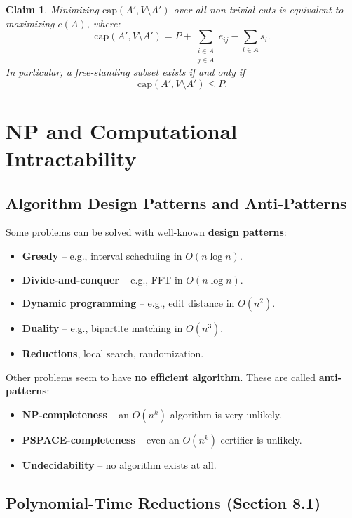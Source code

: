 \documentclass[12pt,a4paper]{report}
\newtheorem{claim}{Claim}
\begin{document}
\begin{claim}
Minimizing $\mathrm{cap}(A', V \setminus A')$ over all non-trivial cuts
is equivalent to maximizing $c(A)$, where:
\[
\mathrm{cap}(A', V \setminus A') = P + \sum_{\substack{i \in A \\ j \in A}} e_{ij} - \sum_{i \in A} s_i.
\]
In particular, a free-standing subset exists if and only if
\[
\mathrm{cap}(A', V \setminus A') \leq P.
\]
\end{claim}
\chapter{NP and Computational
Intractability}
\section{Algorithm Design Patterns and Anti-Patterns}

Some problems can be solved with well-known \textbf{design patterns}:
\begin{itemize}
    \item \textbf{Greedy} -- e.g., interval scheduling in $O(n \log n)$.
    \item \textbf{Divide-and-conquer} -- e.g., FFT in $O(n \log n)$.
    \item \textbf{Dynamic programming} -- e.g., edit distance in $O(n^2)$.
    \item \textbf{Duality} -- e.g., bipartite matching in $O(n^3)$.
    \item \textbf{Reductions}, local search, randomization.
\end{itemize}

Other problems seem to have \textbf{no efficient algorithm}. These are called \textbf{anti-patterns}:
\begin{itemize}
    \item \textbf{NP-completeness} -- an $O(n^k)$ algorithm is very unlikely.
    \item \textbf{PSPACE-completeness} -- even an $O(n^k)$ certifier is unlikely.
    \item \textbf{Undecidability} -- no algorithm exists at all.
\end{itemize}

\section{Polynomial-Time Reductions (Section 8.1)}
\end{document}
